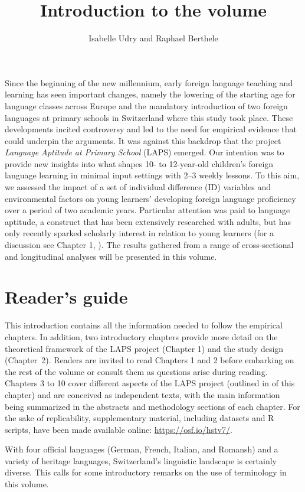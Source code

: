 \documentclass[output=paper]{langsci/langscibook}
\author{Isabelle Udry\affiliation{University of Fribourg, Institut de Plurilinguisme; Zurich University of Teacher Education} and Raphael Berthele\affiliation{University of Fribourg, Institut de Plurilinguisme}}
\title{Introduction to the volume}
\begin{document}
\maketitle 

Since the beginning of the new millennium, early foreign language teaching and learning has seen important changes, namely the lowering of the starting age for language classes across Europe and the mandatory introduction of two foreign languages at primary schools in Switzerland where this study took place. These developments incited controversy and led to the need for empirical evidence that could underpin the arguments. It was against this backdrop that the project \textit{Language Aptitude at Primary School} (LAPS) emerged. Our intention was to provide new insights into what shapes 10- to 12-year-old children’s foreign language learning in minimal input settings with 2--3 weekly lessons. To this aim, we assessed the impact of a set of individual difference (ID) variables and environmental factors on young learners’ developing foreign language proficiency over a period of two academic years. Particular attention was paid to language aptitude, a construct that has been extensively researched with adults, but has only recently sparked scholarly interest in relation to young learners (for a discussion see Chapter 1, ). The results gathered from a range of cross-sectional and longitudinal analyses will be presented in this volume. 

\section{Reader’s guide}

This introduction contains all the information needed to follow the empirical chapters. In addition, two introductory chapters provide more detail on the theoretical framework of the LAPS project (Chapter 1) and the study design (Chapter~2). Readers are invited to read Chapters 1 and 2 before embarking on the rest of the volume or consult them as questions arise during reading. Chapters 3 to 10 cover different aspects of the LAPS project (outlined in  of this chapter) and are conceived as independent texts, with the main information being summarized in the abstracts and methodology sections of each chapter. For the sake of replicability, supplementary material, including datasets and R scripts, have been made available online: \url{https://osf.io/hstv7/}.

With four official languages (German, French, Italian, and Romansh) and a variety of heritage languages, Switzerland’s linguistic landscape is certainly diverse. This calls for some introductory remarks on the use of terminology in this volume. 
\end{document}
